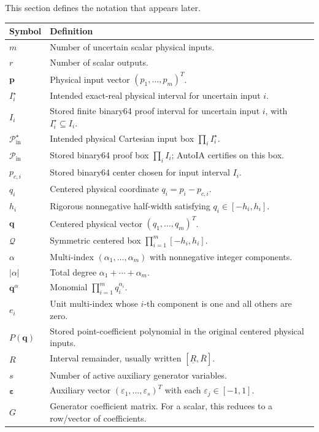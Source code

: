 \documentclass[11pt]{article}
\newcommand{\Qdom}{\mathcal{Q}}
\newcommand{\Pin}{\mathcal{P}_{\mathrm{in}}}
\newcommand{\eps}{\varepsilon}
\newcommand{\epsv}{\boldsymbol{\varepsilon}}
\newcommand{\qv}{\mathbf{q}}
\newcommand{\pv}{\mathbf{p}}
\begin{document}
This section defines the notation that appears later.

\begin{longtable}{p{}p{}}
\toprule
Symbol & Definition \\
\midrule
\endhead
\(m\) & Number of uncertain scalar physical inputs. \\
\(r\) & Number of scalar outputs. \\
\(\pv\) & Physical input vector \((p_1,\ldots,p_m)^T\). \\
\(I_i^\star\) & Intended exact-real physical interval for uncertain input \(i\). \\
\(I_i\) & Stored finite binary64 proof interval for uncertain input \(i\), with \(I_i^\star\subseteq I_i\). \\
\(\Pin^\star\) & Intended physical Cartesian input box \(\prod_i I_i^\star\). \\
\(\Pin\) & Stored binary64 proof box \(\prod_i I_i\); AutoIA certifies on this box. \\
\(p_{c,i}\) & Stored binary64 center chosen for input interval \(I_i\). \\
\(q_i\) & Centered physical coordinate \(q_i=p_i-p_{c,i}\). \\
\(h_i\) & Rigorous nonnegative half-width satisfying \(q_i\in[-h_i,h_i]\). \\
\(\qv\) & Centered physical vector \((q_1,\ldots,q_m)^T\). \\
\(\Qdom\) & Symmetric centered box \(\prod_{i=1}^m[-h_i,h_i]\). \\
\(\alpha\) & Multi-index \((\alpha_1,\ldots,\alpha_m)\) with nonnegative integer components. \\
\(|\alpha|\) & Total degree \(\alpha_1+\cdots+\alpha_m\). \\
\(\qv^\alpha\) & Monomial \(\prod_{i=1}^m q_i^{\alpha_i}\). \\
\(e_i\) & Unit multi-index whose \(i\)-th component is one and all others are zero. \\
\(P(\qv)\) & Stored point-coefficient polynomial in the original centered physical inputs. \\
\(R\) & Interval remainder, usually written \([\underline R,\overline R]\). \\
\(s\) & Number of active auxiliary generator variables. \\
\(\epsv\) & Auxiliary vector \((\eps_1,\ldots,\eps_s)^T\) with each \(\eps_j\in[-1,1]\). \\
\(G\) & Generator coefficient matrix.  For a scalar, this reduces to a row/vector of coefficients. \\

\end{longtable}
\end{document}

